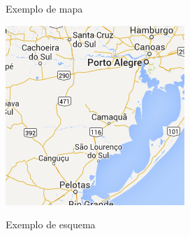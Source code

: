 \begin{mapa}[!htpb]
 \centering
	\caption{Exemplo de mapa}
	\label{map:grafico7}
 	\includegraphics[scale=0.5]{figuras/mapa}
\end{mapa}

\begin{esquema}[!htpb]
 \centering
	\caption{Exemplo de esquema}
	\label{esq:grafico10}
\end{esquema}

